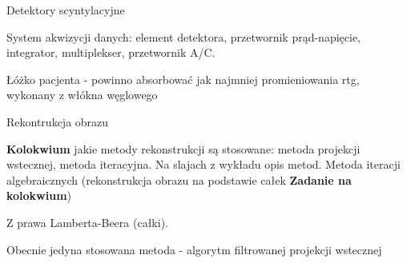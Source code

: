 \documentclass{article}
\begin{document}
Detektory scyntylacyjne

System akwizycji danych: element detektora, przetwornik prąd-napięcie, integrator, multiplekser, przetwornik A\slash C.

Łóżko pacjenta - powinno absorbować jak najmniej promieniowania rtg, wykonany z włókna węglowego

Rekontrukcja obrazu

\textbf{Kolokwium} jakie metody rekonstrukcji są stosowane: metoda projekcji wstecznej, metoda iteracyjna. Na slajach z wykładu opis metod. Metoda iteracji algebraicznych (rekonstrukcja obrazu na podstawie całek \textbf{Zadanie na kolokwium})

Z prawa Lamberta-Beera (całki).

Obecnie jedyna stosowana metoda - algorytm filtrowanej projekcji wstecznej
\end{document}
